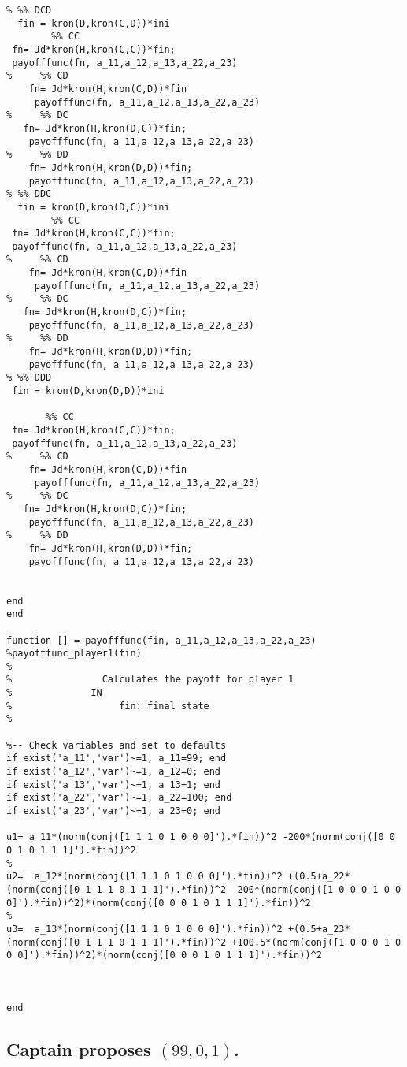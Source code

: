 \begin{lstlisting}
% %% DCD 
  fin = kron(D,kron(C,D))*ini
        %% CC
 fn= Jd*kron(H,kron(C,C))*fin;
 payofffunc(fn, a_11,a_12,a_13,a_22,a_23)
%     %% CD
    fn= Jd*kron(H,kron(C,D))*fin 
     payofffunc(fn, a_11,a_12,a_13,a_22,a_23)
%     %% DC
   fn= Jd*kron(H,kron(D,C))*fin;
    payofffunc(fn, a_11,a_12,a_13,a_22,a_23)
%     %% DD
    fn= Jd*kron(H,kron(D,D))*fin; 
    payofffunc(fn, a_11,a_12,a_13,a_22,a_23)
% %% DDC 
  fin = kron(D,kron(D,C))*ini
        %% CC
 fn= Jd*kron(H,kron(C,C))*fin;
 payofffunc(fn, a_11,a_12,a_13,a_22,a_23)
%     %% CD
    fn= Jd*kron(H,kron(C,D))*fin 
     payofffunc(fn, a_11,a_12,a_13,a_22,a_23)
%     %% DC
   fn= Jd*kron(H,kron(D,C))*fin;
    payofffunc(fn, a_11,a_12,a_13,a_22,a_23)
%     %% DD
    fn= Jd*kron(H,kron(D,D))*fin; 
    payofffunc(fn, a_11,a_12,a_13,a_22,a_23)
% %% DDD 
 fin = kron(D,kron(D,D))*ini
 
       %% CC
 fn= Jd*kron(H,kron(C,C))*fin;
 payofffunc(fn, a_11,a_12,a_13,a_22,a_23)
%     %% CD
    fn= Jd*kron(H,kron(C,D))*fin 
     payofffunc(fn, a_11,a_12,a_13,a_22,a_23)
%     %% DC
   fn= Jd*kron(H,kron(D,C))*fin;
    payofffunc(fn, a_11,a_12,a_13,a_22,a_23)
%     %% DD
    fn= Jd*kron(H,kron(D,D))*fin; 
    payofffunc(fn, a_11,a_12,a_13,a_22,a_23)


end
end

function [] = payofffunc(fin, a_11,a_12,a_13,a_22,a_23)
%payofffunc_player1(fin)
%   
%                Calculates the payoff for player 1
%              IN
%                   fin: final state
%  

%-- Check variables and set to defaults
if exist('a_11','var')~=1, a_11=99; end
if exist('a_12','var')~=1, a_12=0; end
if exist('a_13','var')~=1, a_13=1; end
if exist('a_22','var')~=1, a_22=100; end
if exist('a_23','var')~=1, a_23=0; end

u1= a_11*(norm(conj([1 1 1 0 1 0 0 0]').*fin))^2 -200*(norm(conj([0 0 0 1 0 1 1 1]').*fin))^2
% 
u2=  a_12*(norm(conj([1 1 1 0 1 0 0 0]').*fin))^2 +(0.5+a_22*(norm(conj([0 1 1 1 0 1 1 1]').*fin))^2 -200*(norm(conj([1 0 0 0 1 0 0 0]').*fin))^2)*(norm(conj([0 0 0 1 0 1 1 1]').*fin))^2
% 
u3=  a_13*(norm(conj([1 1 1 0 1 0 0 0]').*fin))^2 +(0.5+a_23*(norm(conj([0 1 1 1 0 1 1 1]').*fin))^2 +100.5*(norm(conj([1 0 0 0 1 0 0 0]').*fin))^2)*(norm(conj([0 0 0 1 0 1 1 1]').*fin))^2
   

    
end
\end{lstlisting}

\subsection{ Captain proposes $(99,0,1)$.}
 
